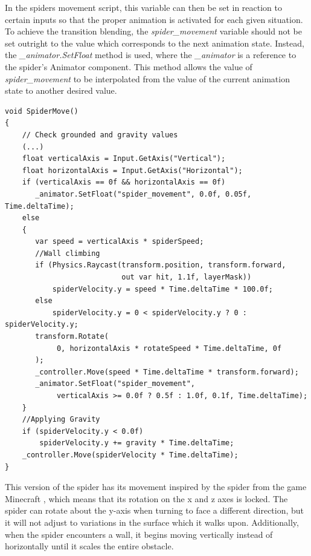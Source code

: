 In the spiders movement script, this variable can then be set in reaction to
certain inputs so that the proper animation is activated for each given situation.
To achieve the transition blending, the \textit{spider\_movement} variable
should not be set outright to the value which corresponds to the next animation
state. Instead, the \textit{\_animator.SetFloat} method is used, where the
\textit{\_animator} is a reference to the spider's Animator component. This
method allows the value of \textit{spider\_movement} to be interpolated from the value of
the current animation state to another desired value.
\newline
\begin{lstlisting}[basicstyle=\footnotesize, numbers=none,frame=single,
caption={Moving the baked version of the spider, and playing the appropriate
animations by setting the \textit{spider\_movement} variable using the
\textit{\_animator.SetFloat()} method.
\textit{BakedSpiderMovement.cs}},captionpos=b, label=set_float,
language={[Sharp]c}, float=tp]
void SpiderMove()
{
    // Check grounded and gravity values
    (...)
    float verticalAxis = Input.GetAxis("Vertical");
    float horizontalAxis = Input.GetAxis("Horizontal");
    if (verticalAxis == 0f && horizontalAxis == 0f)
       _animator.SetFloat("spider_movement", 0.0f, 0.05f, Time.deltaTime);
    else
    {
       var speed = verticalAxis * spiderSpeed;
       //Wall climbing
       if (Physics.Raycast(transform.position, transform.forward, 
                           out var hit, 1.1f, layerMask))
           spiderVelocity.y = speed * Time.deltaTime * 100.0f;
       else
           spiderVelocity.y = 0 < spiderVelocity.y ? 0 : spiderVelocity.y;
       transform.Rotate(
            0, horizontalAxis * rotateSpeed * Time.deltaTime, 0f
       );
       _controller.Move(speed * Time.deltaTime * transform.forward);
       _animator.SetFloat("spider_movement", 
            verticalAxis >= 0.0f ? 0.5f : 1.0f, 0.1f, Time.deltaTime);
    }
    //Applying Gravity
    if (spiderVelocity.y < 0.0f)
        spiderVelocity.y += gravity * Time.deltaTime;
    _controller.Move(spiderVelocity * Time.deltaTime);
}
\end{lstlisting}

This version of the spider has its movement inspired by the spider from the game
Minecraft \cite{minecraft}, which means that its rotation on the x and z axes is locked. The
spider can rotate about the y-axis when turning to face a different direction,
but it will not adjust to variations in the surface which it walks upon.
Additionally, when the spider encounters a wall, it begins moving
vertically instead of horizontally until it scales the entire obstacle.\\

